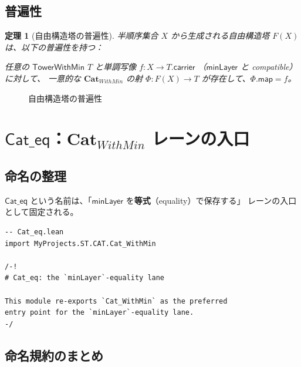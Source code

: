 \documentclass[a4paper,11pt]{ltjsarticle}
\theoremstyle{definition}
\theoremstyle{plain}
\newtheorem{theorem}[definition]{定理}
\newcommand{\CatWithMin}{\mathbf{Cat}_{WithMin}}
\newcommand{\TowerWithMin}{\mathsf{TowerWithMin}}
\newcommand{\minLayer}{\mathsf{minLayer}}
\begin{document}
\subsection{普遍性}

\begin{theorem}[自由構造塔の普遍性]
\label{thm:free-tower-universal}
半順序集合 $X$ から生成される自由構造塔 $F(X)$ は、以下の普遍性を持つ：

任意の $\TowerWithMin$ $T$ と単調写像 $f : X \to T.\mathsf{carrier}$
（$\minLayer$ と compatible）に対して、
一意的な $\CatWithMin$ の射 $\Phi : F(X) \to T$ が存在して、$\Phi.\mathsf{map} = f$。
\end{theorem}

\begin{figure}[htbp]
\centering
{}
\caption{自由構造塔の普遍性}
\label{fig:free-tower-universal}
\end{figure}

\section{$\mathsf{Cat\_eq}$：$\CatWithMin$ レーンの入口}
\label{sec:cat-eq}

\subsection{命名の整理}

$\mathsf{Cat\_eq}$ という名前は、「$\minLayer$ を\textbf{等式}（equality）で保存する」
レーンの入口として固定される。

\begin{leancode}
\begin{lstlisting}
-- Cat_eq.lean
import MyProjects.ST.CAT.Cat_WithMin

/-!
# Cat_eq: the `minLayer`-equality lane

This module re-exports `Cat_WithMin` as the preferred
entry point for the `minLayer`-equality lane.
-/
\end{lstlisting}
\end{leancode}

\subsection{命名規約のまとめ}
\end{document}
